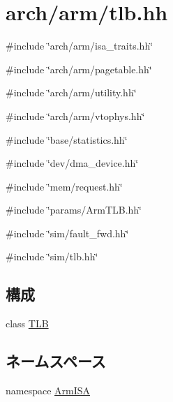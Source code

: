 \hypertarget{arch_2arm_2tlb_8hh}{
\section{arch/arm/tlb.hh}
\label{arch_2arm_2tlb_8hh}
}
{\ttfamily \#include \char`\"{}arch/arm/isa\_\-traits.hh\char`\"{}}\par
{\ttfamily \#include \char`\"{}arch/arm/pagetable.hh\char`\"{}}\par
{\ttfamily \#include \char`\"{}arch/arm/utility.hh\char`\"{}}\par
{\ttfamily \#include \char`\"{}arch/arm/vtophys.hh\char`\"{}}\par
{\ttfamily \#include \char`\"{}base/statistics.hh\char`\"{}}\par
{\ttfamily \#include \char`\"{}dev/dma\_\-device.hh\char`\"{}}\par
{\ttfamily \#include \char`\"{}mem/request.hh\char`\"{}}\par
{\ttfamily \#include \char`\"{}params/ArmTLB.hh\char`\"{}}\par
{\ttfamily \#include \char`\"{}sim/fault\_\-fwd.hh\char`\"{}}\par
{\ttfamily \#include \char`\"{}sim/tlb.hh\char`\"{}}\par
\subsection*{構成}
\begin{DoxyCompactItemize}
\item 
class \hyperlink{classArmISA_1_1TLB}{TLB}
\end{DoxyCompactItemize}
\subsection*{ネームスペース}
\begin{DoxyCompactItemize}
\item 
namespace \hyperlink{namespaceArmISA}{ArmISA}
\end{DoxyCompactItemize}
